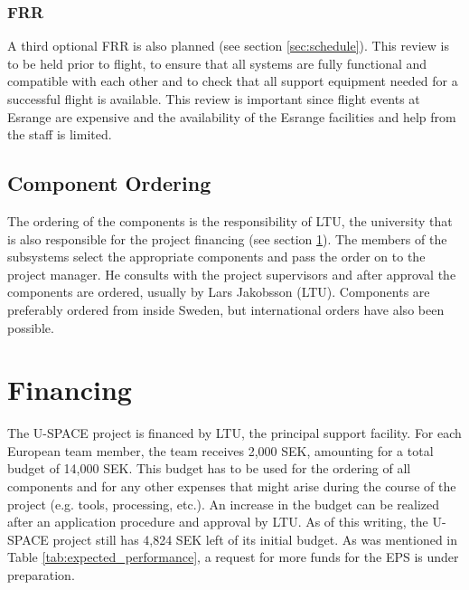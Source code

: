 \subsubsection*{\acl{FRR}}
A third optional \ac{FRR} is also planned (see section \ref{sec:schedule}). This review is to be held prior to flight, to ensure that all systems are fully functional and compatible with each other and to check that all support equipment needed for a successful flight is available. This review is important since flight events at Esrange are expensive and the availability of the Esrange facilities and help from the staff is limited.
%
%
\subsection{Component Ordering}
%
The ordering of the components is the responsibility of \ac{LTU}, the university that is also responsible for the project financing (see section \ref{sec:financing}). The members of the subsystems select the appropriate components and pass the order on to the project manager. He consults with the project supervisors and after approval the components are ordered, usually by Lars Jakobsson (\ac{LTU}). Components are preferably ordered from inside Sweden, but international orders have also been possible.
%
\section{Financing}
\label{sec:financing}
%
The \ac{U-SPACE} project is financed by \ac{LTU}, the principal support facility. For each European team member, the team receives 2,000 SEK, amounting for a total budget of 14,000 SEK. This budget has to be used for the ordering of all components and for any other expenses that might arise during the course of the project (e.g. tools, processing, etc.). An increase in the budget can be realized after an application procedure and approval by \ac{LTU}. As of this writing, the \ac{U-SPACE} project still has 4,824 SEK left of its initial budget. As was mentioned in Table \ref{tab:expected_performance}, a request for more funds for the \ac{EPS} is under preparation.
%
%
